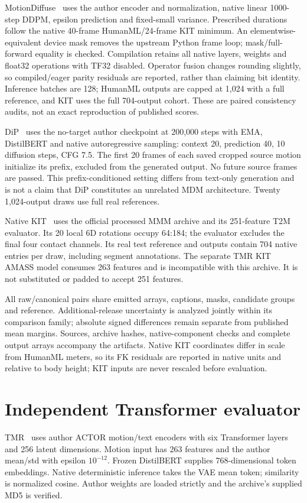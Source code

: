MotionDiffuse~\cite{motiondiffuse2024} uses the author encoder and normalization, native linear 1000-step DDPM, epsilon prediction and fixed-small variance. Prescribed durations follow the native 40-frame HumanML/24-frame KIT minimum. An elementwise-equivalent device mask removes the upstream Python frame loop; mask/full-forward equality is checked. Compilation retains all native layers, weights and float32 operations with TF32 disabled. Operator fusion changes rounding slightly, so compiled/eager parity residuals are reported, rather than claiming bit identity. Inference batches are 128; HumanML outputs are capped at 1,024 with a full reference, and KIT uses the full 704-output cohort. These are paired consistency audits, not an exact reproduction of published scores.

DiP~\cite{closd2025} uses the no-target author checkpoint at 200,000 steps with EMA, DistilBERT and native autoregressive sampling: context 20, prediction 40, 10 diffusion steps, CFG 7.5. The first 20 frames of each saved cropped source motion initialize its prefix, excluded from the generated output. No future source frames are passed. This prefix-conditioned setting differs from text-only generation and is not a claim that DiP constitutes an unrelated MDM architecture. Twenty 1,024-output draws use full real references.

Native KIT~\cite{kit2016} uses the official processed MMM archive and its 251-feature T2M evaluator. Its 20 local 6D rotations occupy 64:184; the evaluator excludes the final four contact channels. Its real test reference and outputs contain 704 native entries per draw, including segment annotations. The separate TMR KIT AMASS model consumes 263 features and is incompatible with this archive. It is not substituted or padded to accept 251 features.

All raw/canonical pairs share emitted arrays, captions, masks, candidate groups and reference. Additional-release uncertainty is analyzed jointly within its comparison family; absolute signed differences remain separate from published mean margins. Sources, archive hashes, native-component checks and complete output arrays accompany the artifacts. Native KIT coordinates differ in scale from HumanML meters, so its FK residuals are reported in native units and relative to body height; KIT inputs are never rescaled before evaluation.

\section{Independent Transformer evaluator}

TMR~\cite{tmr2023} uses author ACTOR motion/text encoders with six Transformer layers and 256 latent dimensions. Motion input has 263 features and the author mean/std with epsilon $10^{-12}$. Frozen DistilBERT supplies 768-dimensional token embeddings. Native deterministic inference takes the VAE mean token; similarity is normalized cosine. Author weights are loaded strictly and the archive's supplied MD5 is verified.

